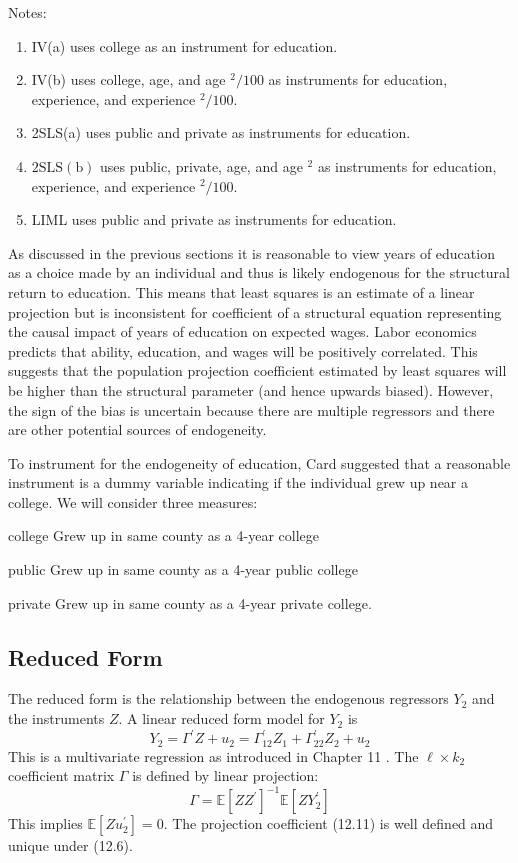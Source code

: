\documentclass[10pt]{article}
\begin{document}
Notes:

\begin{enumerate}
  \item IV(a) uses college as an instrument for education.

  \item IV(b) uses college, age, and age $^{2} / 100$ as instruments for education, experience, and experience ${ }^{2} / 100$.

  \item 2SLS(a) uses public and private as instruments for education.

  \item $2 \mathrm{SLS}(\mathrm{b})$ uses public, private, age, and age ${ }^{2}$ as instruments for education, experience, and experience $^{2} / 100$.

  \item LIML uses public and private as instruments for education.

\end{enumerate}
As discussed in the previous sections it is reasonable to view years of education as a choice made by an individual and thus is likely endogenous for the structural return to education. This means that least squares is an estimate of a linear projection but is inconsistent for coefficient of a structural equation representing the causal impact of years of education on expected wages. Labor economics predicts that ability, education, and wages will be positively correlated. This suggests that the population projection coefficient estimated by least squares will be higher than the structural parameter (and hence upwards biased). However, the sign of the bias is uncertain because there are multiple regressors and there are other potential sources of endogeneity.

To instrument for the endogeneity of education, Card suggested that a reasonable instrument is a dummy variable indicating if the individual grew up near a college. We will consider three measures:

college Grew up in same county as a 4-year college

public Grew up in same county as a 4-year public college

private Grew up in same county as a 4-year private college.

\subsection{Reduced Form}
The reduced form is the relationship between the endogenous regressors $Y_{2}$ and the instruments $Z$. A linear reduced form model for $Y_{2}$ is
$$
Y_{2}=\Gamma^{\prime} Z+u_{2}=\Gamma_{12}^{\prime} Z_{1}+\Gamma_{22}^{\prime} Z_{2}+u_{2}
$$
This is a multivariate regression as introduced in Chapter 11 . The $\ell \times k_{2}$ coefficient matrix $\Gamma$ is defined by linear projection:
$$
\Gamma=\mathbb{E}\left[Z Z^{\prime}\right]^{-1} \mathbb{E}\left[Z Y_{2}^{\prime}\right]
$$
This implies $\mathbb{E}\left[Z u_{2}^{\prime}\right]=0$. The projection coefficient (12.11) is well defined and unique under (12.6).
\end{document}
